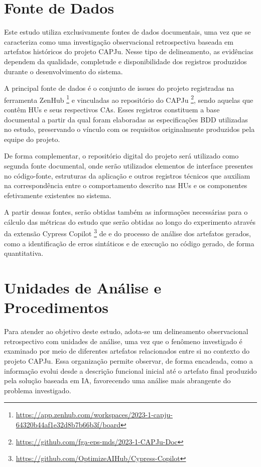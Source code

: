 \section{Fonte de Dados}

Este estudo utiliza exclusivamente fontes de dados documentais, uma vez que se caracteriza como uma investigação observacional retrospectiva baseada em artefatos históricos do projeto CAPJu. Nesse tipo de delineamento, as evidências dependem da qualidade, completude e disponibilidade dos registros produzidos durante o desenvolvimento do sistema.

A principal fonte de dados é o conjunto de issues do projeto registradas na ferramenta ZenHub \footnote{\url{https://app.zenhub.com/workspaces/2023-1-capju-64320b44af1e32d8b7b66b3f/board}} e vinculadas ao repositório do CAPJu \footnote{\url{https://github.com/fga-eps-mds/2023-1-CAPJu-Doc}}, sendo aquelas que contêm HUs e seus respectivos CAs. Esses registros constituem a base documental a partir da qual foram elaboradas as especificações BDD utilizadas no estudo, preservando o vínculo com os requisitos originalmente produzidos pela equipe do projeto.

De forma complementar, o repositório digital do projeto será utilizado como segunda fonte documental, onde serão utilizados elementos de interface presentes no código-fonte, estruturas da aplicação e outros registros técnicos que auxiliam na correspondência entre o comportamento descrito nas HUs e os componentes efetivamente existentes no sistema.

A partir dessas fontes, serão obtidas também as informações necessárias para o cálculo das métricas do estudo que serão obtidas ao longo do experimento através da extensão Cypress Copilot \footnote{\url{https://github.com/OptimizeAIHub/Cypress-Copilot}} de  e do processo de análise dos artefatos gerados, como a identificação de erros sintáticos e de execução no código gerado, de forma quantitativa.

\section{Unidades de Análise e Procedimentos}

Para atender ao objetivo deste estudo, adota-se um delineamento observacional retrospectivo com unidades de análise, uma vez que o fenômeno investigado é examinado por meio de diferentes artefatos relacionados entre si no contexto do projeto CAPJu. Essa organização permite observar, de forma encadeada, como a informação evolui desde a descrição funcional inicial até o artefato final produzido pela solução baseada em IA, favorecendo uma análise mais abrangente do problema investigado.

